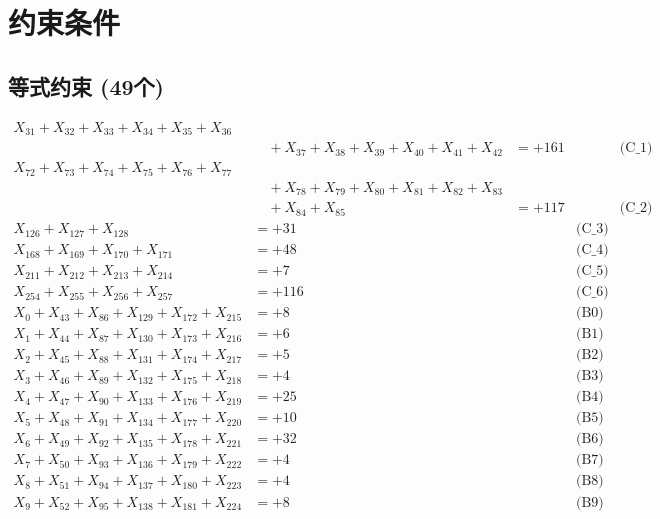 \documentclass[a4paper,10pt]{article}
\begin{document}
\section{约束条件}

\subsection{等式约束 (49个)}

\allowdisplaybreaks
{\small
\begin{align}
X_{31} + X_{32} + X_{33} + X_{34} + X_{35} + X_{36} \\[0.1ex]
&\quad  + X_{37} + X_{38} + X_{39} + X_{40} + X_{41} + X_{42} &= +161 && \text{(C\_1)} \\
X_{72} + X_{73} + X_{74} + X_{75} + X_{76} + X_{77} \\[0.1ex]
&\quad  + X_{78} + X_{79} + X_{80} + X_{81} + X_{82} + X_{83} \\[0.1ex]
&\quad  + X_{84} + X_{85} &= +117 && \text{(C\_2)} \\
X_{126} + X_{127} + X_{128} &= +31 && \text{(C\_3)} \\
X_{168} + X_{169} + X_{170} + X_{171} &= +48 && \text{(C\_4)} \\
X_{211} + X_{212} + X_{213} + X_{214} &= +7 && \text{(C\_5)} \\
\allowbreak
X_{254} + X_{255} + X_{256} + X_{257} &= +116 && \text{(C\_6)} \\
X_{0} + X_{43} + X_{86} + X_{129} + X_{172} + X_{215} &= +8 && \text{(B0)} \\
X_{1} + X_{44} + X_{87} + X_{130} + X_{173} + X_{216} &= +6 && \text{(B1)} \\
X_{2} + X_{45} + X_{88} + X_{131} + X_{174} + X_{217} &= +5 && \text{(B2)} \\
X_{3} + X_{46} + X_{89} + X_{132} + X_{175} + X_{218} &= +4 && \text{(B3)} \\
\allowbreak
X_{4} + X_{47} + X_{90} + X_{133} + X_{176} + X_{219} &= +25 && \text{(B4)} \\
X_{5} + X_{48} + X_{91} + X_{134} + X_{177} + X_{220} &= +10 && \text{(B5)} \\
X_{6} + X_{49} + X_{92} + X_{135} + X_{178} + X_{221} &= +32 && \text{(B6)} \\
X_{7} + X_{50} + X_{93} + X_{136} + X_{179} + X_{222} &= +4 && \text{(B7)} \\
X_{8} + X_{51} + X_{94} + X_{137} + X_{180} + X_{223} &= +4 && \text{(B8)} \\
\allowbreak
X_{9} + X_{52} + X_{95} + X_{138} + X_{181} + X_{224} &= +8 && \text{(B9)} \\

\end{align}}
\end{document}
